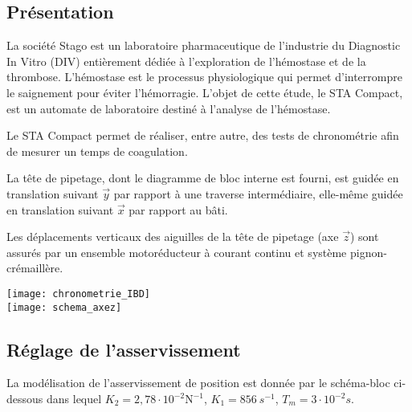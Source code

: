 \setcounter{exo}{0}
\begin{multicols}{2}


\subsection*{Présentation}

La société Stago est un laboratoire pharmaceutique de l'industrie du Diagnostic In Vitro (DIV) entièrement dédiée à l'exploration de l'hémostase et de la thrombose. L'hémostase est le processus physiologique qui permet d'interrompre le saignement pour éviter l'hémorragie. L'objet de cette étude, le STA Compact, est un automate de laboratoire destiné à l'analyse de l'hémostase.

Le STA Compact permet de réaliser, entre autre, des tests de chronométrie afin de mesurer un
temps de coagulation. 


La tête de pipetage, dont le diagramme de bloc interne est fourni, est guidée en
translation suivant $\overrightarrow{y}$ par rapport à une traverse intermédiaire, elle-même guidée en translation
suivant $\overrightarrow{x}$ par rapport au bâti. 

Les déplacements verticaux des aiguilles de la tête de pipetage (axe $\overrightarrow{z}$) sont assurés par un ensemble
motoréducteur à courant continu et système pignon-crémaillère.




	\begin{center}
			\texttt{[image: chronometrie\_IBD]}\\
			\texttt{[image: schema\_axez]}
    \end{center}


\subsection*{Réglage de l'asservissement}


La modélisation de l'asservissement de position est donnée par le schéma-bloc ci-dessous dans lequel $K_2 = 2,78 \cdot 10^{-2} \text{N}^{-1}$, $K_1 = \SI{856}{s^{-1}}$, $T_m= 3\cdot  10^{-2} s$.


\end{multicols}
